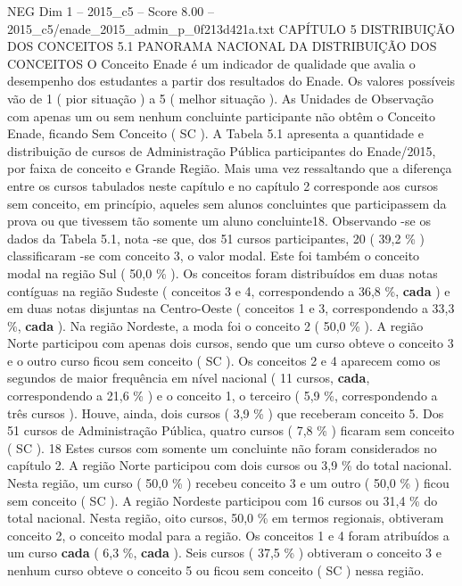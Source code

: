 \begin{textsample}{NEG Dim 1 – 2015\_c5 – Score 8.00 – 2015\_c5/enade\_2015\_admin\_p\_0f213d421a.txt}  \label{ex:f1_neg_350}
CAPÍTULO 5 DISTRIBUIÇÃO DOS CONCEITOS 5.1 PANORAMA NACIONAL DA DISTRIBUIÇÃO DOS CONCEITOS O Conceito Enade é um indicador de qualidade que avalia o desempenho dos estudantes a partir dos resultados do Enade.
Os valores possíveis vão de 1 ( pior situação ) a 5 ( melhor situação ).
As Unidades de Observação com apenas um ou sem nenhum concluinte participante não obtêm o Conceito Enade, ficando Sem Conceito ( SC ).
A Tabela 5.1 apresenta a quantidade e distribuição de cursos de Administração Pública participantes do Enade/2015, por faixa de conceito e Grande Região.
Mais uma vez ressaltando que a diferença entre os cursos tabulados neste capítulo e no capítulo 2 corresponde aos cursos sem conceito, em princípio, aqueles sem alunos concluintes que participassem da prova ou que tivessem tão somente um aluno concluinte18.
Observando -se os dados da Tabela 5.1, nota -se que, dos 51 cursos participantes, 20 ( 39,2 \% ) classificaram -se com conceito 3, o valor modal.
Este foi também o conceito modal na região Sul ( 50,0 \% ).
Os conceitos foram distribuídos em duas notas contíguas na região Sudeste ( conceitos 3 e 4, correspondendo a 36,8 \%, \textbf{cada} ) e em duas notas disjuntas na Centro-Oeste ( conceitos 1 e 3, correspondendo a 33,3 \%, \textbf{cada} ).
Na região Nordeste, a moda foi o conceito 2 ( 50,0 \% ).
A região Norte participou com apenas dois cursos, sendo que um curso obteve o conceito 3 e o outro curso ficou sem conceito ( SC ).
Os conceitos 2 e 4 aparecem como os segundos de maior frequência em nível nacional ( 11 cursos, \textbf{cada}, correspondendo a 21,6 \% ) e o conceito 1, o terceiro ( 5,9 \%, correspondendo a três cursos ).
Houve, ainda, dois cursos ( 3,9 \% ) que receberam conceito 5.
Dos 51 cursos de Administração Pública, quatro cursos ( 7,8 \% ) ficaram sem conceito ( SC ). 18 Estes cursos com somente um concluinte não foram considerados no capítulo 2.
A região Norte participou com dois cursos ou 3,9 \% do total nacional.
Nesta região, um curso ( 50,0 \% ) recebeu conceito 3 e um outro ( 50,0 \% ) ficou sem conceito ( SC ).
A região Nordeste participou com 16 cursos ou 31,4 \% do total nacional.
Nesta região, oito cursos, 50,0 \% em termos regionais, obtiveram conceito 2, o conceito modal para a região.
Os conceitos 1 e 4 foram atribuídos a um curso \textbf{cada} ( 6,3 \%, \textbf{cada} ).
Seis cursos ( 37,5 \% ) obtiveram o conceito 3 e nenhum curso obteve o conceito 5 ou ficou sem conceito ( SC ) nessa região.

\end{textsample}
